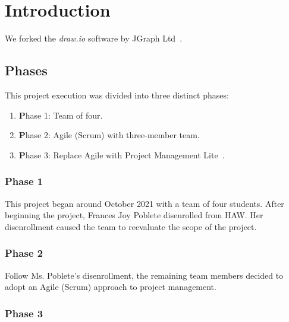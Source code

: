 %
\chapter{Introduction}
 We forked the \emph{draw.io} software by JGraph Ltd~\cite{drawioCode}.

\section{Phases}\label{sec:phases}
This project execution was divided into three distinct phases:
\begin{enumerate}
 \item {\textbf Phase 1}: Team of four.
 \item {\textbf Phase 2}: Agile (Scrum) with three-member team.
 \item {\textbf Phase 3}: Replace Agile with Project Management Lite~\cite{pmlite}.
\end{enumerate}

\subsection{Phase 1}\label{subsec:phase-1}
This project began around October 2021 with a team of four students.
After beginning the project, Frances Joy Poblete disenrolled from HAW.
Her disenrollment caused the team to reevaluate the scope of the project.

\subsection{Phase 2}\label{subsec:phase-2}
Follow Ms. Poblete's disenrollment, the remaining team members decided to adopt an Agile (Scrum) approach to project management.

\subsection{Phase 3}\label{subsec:phase-3}
